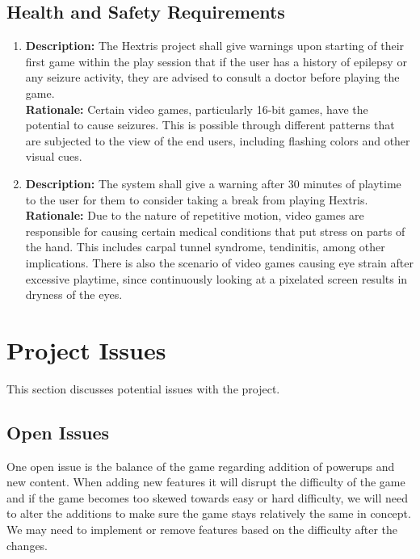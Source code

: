 \documentclass[12pt, titlepage]{article}
\begin{document}
\subsection{Health and Safety Requirements}
\begin{enumerate}[label=HS\arabic*]
\item \textbf{Description:} The Hextris project shall give warnings upon starting of their first game within the play session that if the user has a history of epilepsy or any seizure activity, they are advised to consult a doctor before playing the game. \\
\textbf{Rationale:} Certain video games, particularly 16-bit games, have the potential to cause seizures. This is possible through different patterns that are subjected to the view of the end users, including flashing colors and other visual cues. 

\item \textbf{Description:} The system shall give a warning after 30 minutes of playtime to the user for them to consider taking a break from playing Hextris.\\
\textbf{Rationale:} Due to the nature of repetitive motion, video games are responsible for causing certain medical conditions that put stress on parts of the hand. This includes carpal tunnel syndrome, tendinitis, among other implications. There is also the scenario of video games causing eye strain after excessive playtime, since continuously looking at a pixelated screen results in dryness of the eyes.


\end{enumerate}
\newpage



\section{Project Issues}
This section discusses potential issues with the project.

\subsection{Open Issues}
One open issue is the balance of the game regarding addition of powerups and new content. When adding new features it will disrupt the difficulty of the game and if the game becomes too skewed towards easy or hard difficulty, we will need to alter the additions to make sure the game stays relatively the same in concept. We may need to implement or remove features based on the difficulty after the changes. 
\end{document}
